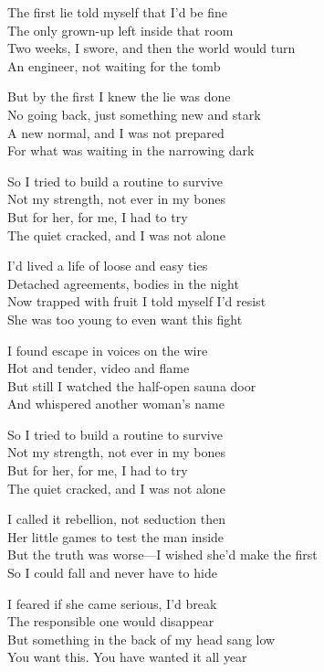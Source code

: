 \begin{lyrics}
The first lie told myself that I'd be fine\\
The only grown-up left inside that room\\
Two weeks, I swore, and then the world would turn\\
An engineer, not waiting for the tomb

But by the first I knew the lie was done\\
No going back, just something new and stark\\
A new normal, and I was not prepared\\
For what was waiting in the narrowing dark

So I tried to build a routine to survive\\
Not my strength, not ever in my bones\\
But for her, for me, I had to try\\
The quiet cracked, and I was not alone

I'd lived a life of loose and easy ties\\
Detached agreements, bodies in the night\\
Now trapped with fruit I told myself I'd resist\\
She was too young to even want this fight

I found escape in voices on the wire\\
Hot and tender, video and flame\\
But still I watched the half-open sauna door\\
And whispered another woman's name

So I tried to build a routine to survive\\
Not my strength, not ever in my bones\\
But for her, for me, I had to try\\
The quiet cracked, and I was not alone

I called it rebellion, not seduction then\\
Her little games to test the man inside\\
But the truth was worse—I wished she'd make the first\\
So I could fall and never have to hide

I feared if she came serious, I'd break\\
The responsible one would disappear\\
But something in the back of my head sang low\\
You want this. You have wanted it all year


\end{lyrics}
